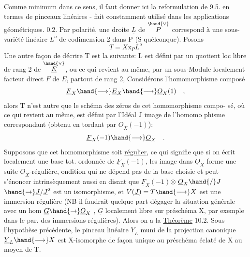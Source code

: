 
Comme minimum dans ce sens, il faut  donner ici la reformulation de 9.5.
en termes de pinceaux linéaires  -  fait constamment utilisé dans les
applications géométriques.
0.2.  Par polarité, une droite $\underline{L}$  de $\overset{\hand{\vee}}{P}$  correspond à une sous-variété
linéaire $L^{o}$ de codimension 2 dans P  (S quélconque).  Posons
\[ T = X\mathrm{x}_{P}L^{o} \]
\placedmargin{\unsure{$-\,\cdot$}}Une autre façon  de décrire T est la suivante:  L  est défini par un
quotient loc libre de rang 2 de $\overset{\hand{\vee}}{\underline{E}}$, ou ce qui revient au même, par un
sous-Module localement facteur direct  $\underline{F}$ de $\underline{E}$, partout de rang 2,
Considérons  l'homomorphisme composé
\[ \underline{F}_{X} \hand{\longrightarrow} \underline{E}_{X} \hand{\longrightarrow} \underline{O}_{X}(1) \quad , \]
alors  T n'est autre que  le schéma des zéros de cet homomorphisme compo-%
sé, où ce qui revient au même, est défini par l'Idéal J image de l'homomo%
phisme correspondant (obtenu en tordant par $\underline{O}_{X}(-1)$):
\[ \underline{F}_{X}(-1) \hand{\longrightarrow} \underline{O}_{X} \quad . \]
Supposons
 que cet homomorphisme soit \uline{régulier}, ce qui signifie
que  si on écrit localement une base tot. ordonnée de $\underline{F}_{X}(-1)$,  les image dans $\underline{O}_{X}$\hand{\unsure{$\curvearrowleft$|$\widehat{\ }$}}
forme une suite $\underline{O}_{X}$-régulière, ondition qui ne dépend pas de la base
choisie et peut s'énoncer intrinsèquement aussi en disant que
$\underline{F}_{X}(-1)$$\otimes\ \underline{O}_{X}\hand{/}J$$\hand{\to} \underline{J}/\underline{J}^{2}$  est un isomorphisme, et  $V(\underline{J})=T \hand{\longrightarrow} X$  est  une immersion
\placedmargin{$\|$} régulière  (NB il  faudrait quelque part dégager la situation
générale avec un hom  $\underline{G} \hand{\to} \underline{O}_{X}$ , $\underline{G}$ localement libre sur préschéma X, par
exemple dans le par. des immersions régulières).  Alors on a la
 \uline{Théorème}  10.2.   Sous l'hypothèse précédente, le pinceau
linéaire $\underline{Y}_{L}$  muni de la projection canonique $\underline{Y}_{L} \hand{\longrightarrow} X$  est  X-isomorphe
de façon unique au préschéma éclaté  de X au moyen de T.


